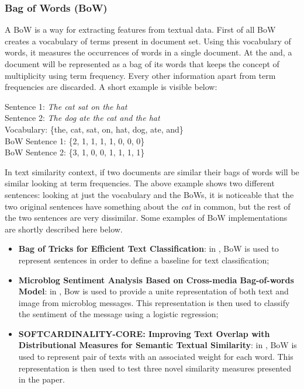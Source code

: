 \documentclass[\main/main.tex]{subfiles}
\begin{document}
\subsubsection{Bag of Words (BoW)}
A BoW is a way for extracting features from textual data. First of all BoW creates a vocabulary of terms present in document set. Using this vocabulary of words, it measures the occurrences of words in a single document. At the and, a document will be represented as a bag of its words that keeps the concept of multiplicity using term frequency. Every other information apart from term frequencies are discarded.
A short example is visible below:
\begin{center}
    Sentence 1: \emph{The cat sat on the hat}\\
    Sentence 2: \emph{The dog ate the cat and the hat}\\
    Vocabulary: \{the, cat, sat, on, hat, dog, ate, and\}\\
    BoW Sentence 1: \{2, 1, 1, 1, 1, 0, 0, 0\}\\
    BoW Sentence 2: \{3, 1, 0, 0, 1, 1, 1, 1\}
\end{center}
In text similarity context, if two documents are similar their bags of words will be similar looking at term frequencies. The above example shows two different sentences: looking at just the vocabulary and the BoWs, it is noticeable that the two original sentences have something about the \emph{cat} in common, but the rest of the two sentences are very dissimilar. Some examples of BoW implementations are shortly described here below.
\begin{itemize}
    \item \textbf{Bag of Tricks for Efficient Text Classification}: in \cite{Joulin2017BagOT}, BoW is used to represent sentences in order to define a baseline for text classification;
    \item \textbf{Microblog Sentiment Analysis Based on Cross-media Bag-of-words Model}: in \cite{Wang2014MicroblogSA}, Bow is used to provide a unite representation of both text and image from microblog messages. This representation is then used to classify the sentiment of the message using a logistic regression;
    \item \textbf{SOFTCARDINALITY-CORE: Improving Text Overlap with Distributional Measures for Semantic Textual Similarity}: in \cite{Jimnez2013SOFTCARDINALITYCOREIT}, BoW is used to represent pair of texts with an associated weight for each word. This representation is then used to test three novel similarity measures presented in the paper.
\end{itemize}
\end{document}
